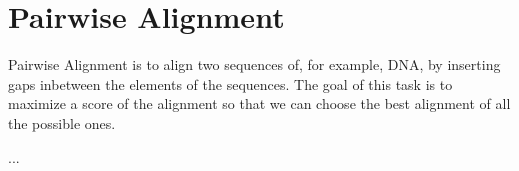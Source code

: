 \section{Pairwise Alignment}
Pairwise Alignment is to align two sequences of, for example, DNA, by inserting gaps inbetween the elements of the sequences.  The goal of this task is to maximize a score of the alignment so that we can choose the best alignment of all the possible ones.

...
